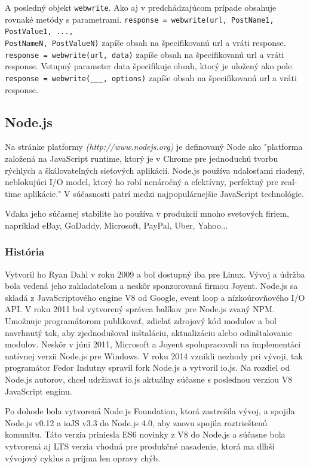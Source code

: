 A posledný objekt \verb|webwrite|. Ako aj v predchádzajúcom prípade obsahuje rovnaké metódy s parametrami. \verb|response = webwrite(url, PostName1, PostValue1, ...,| \\ \verb|PostNameN, PostValueN)| zapíše obsah na špecifikovanú url a vráti response.\\ \verb|response = webwrite(url, data)| zapíše obsah na špecifikovanú url a vráti response. Vstupný parameter data špecifikuje obsah, ktorý je uložený ako pole.\\
\verb|response = webwrite(___, options)| zapíše obsah na špecifikovanú url a vráti response.

\subsection{Node.js}
Na stránke platformy \textit{(http://www.nodejs.org)} je definovaný Node ako "platforma založená na JavaScript runtime, ktorý je v Chrome pre jednoduchú tvorbu rýchlych a škálovateľných sieťových aplikácií. Node.js používa udalosťami riadený, neblokujúci I/O model, ktorý ho robí nenáročný a efektívny, perfektný pre real-time aplikácie." V súčasnosti patrí medzi najpopulárnejšie JavaScript technológie.

Vďaka jeho súčasnej stabilite ho používa v produkcií mnoho svetových firiem, napríklad eBay, GoDaddy, Microsoft, PayPal, Uber, Yahoo...


\subsubsection{História}
Vytvoril ho Ryan Dahl v roku 2009 a bol dostupný iba pre Linux. Vývoj a údržba bola vedená jeho zakladateľom a neskôr sponzorovaná firmou Joyent. Node.js sa skladá z JavaScriptového engine V8 od Google, event loop a nízkoúrovňového I/O API. V roku 2011 bol vytvorený správca balíkov pre Node.js zvaný NPM. Umožnuje programátorom publikovať, zdielať zdrojový kód modulov a bol navrhnutý tak, aby zjednodušoval inštaláciu, aktualizáciu alebo odinštalovanie modulov. Neskôr v júni 2011, Microsoft a Joyent spolupracovali na implementáci natívnej verzii Node.js pre Windows. V roku 2014 vznikli nezhody pri vývoji, tak programátor Fedor Indutny spravil fork Node.js a vytvoril io.js. Na rozdiel od Node.js autorov, chcel udržiavať io.js aktuálny súčasne s poslednou verziou V8 JavaScript enginu.

Po dohode bola vytvorená Node.js Foundation, ktorá zastrešila vývoj, a spojila Node.js v0.12 a ioJS v3.3 do Node.js 4.0, aby znovu spojila roztrieštenú komunitu. Táto verzia priniesla ES6 novinky z V8 do Node.js a súčasne bola vytvorená aj LTS verzia vhodná pre produkčné nasadenie, ktorá ma dlhší vývojový cyklus a príjma len opravy chýb.\cite{nodejs-wiki}

